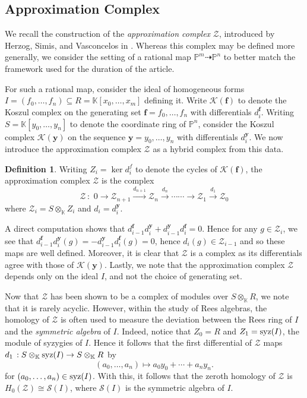 \documentclass[reqno]{amsart}
\numberwithin{equation}{section}
\theoremstyle{definition}
\newtheorem{defn}[thm]{Definition}
\def\Kos{\mathcal{K}}
\def\K{\mathbb{K}}
\def\P{\mathbb{P}}
\def\S{\mathcal{S}}
\def\Z{\mathcal{Z}}
\def\f{\bm{f}}
\def\y{\bm{y}}
\def\syz{\mathop{\rm syz}}
\begin{document}
\subsection{Approximation Complex}

We recall the construction of the \textit{approximation complex} $\Z$, introduced by Herzog, Simis, and Vasconcelos in \cite{HSV82,HSV83}. Whereas this complex may be defined more generally, we consider the setting of a rational map $\P^m\dashrightarrow \P^n$ to better match the framework used for the duration of the article.

For such a rational map, consider the ideal of homogeneous forms $I=(f_0,\ldots,f_n) \subseteq R=\K[x_0,\ldots,x_m]$ defining it. Write $\Kos(\f)$
to denote the Koszul complex on the generating set $\f=f_0,\ldots,f_n$ with differentials $d_i^{\f}$. Writing $S=\K[y_0,\ldots,y_n]$ to denote the coordinate ring of $\P^n$, consider the Koszul complex $\Kos(\y)$ on the sequence $\y= y_0,\ldots,y_n$ with differentials $d_i^{\y}$. We now introduce the approximation complex $\Z$ as a hybrid complex from this data. 


\begin{defn}
Writing $Z_i = \ker d_i^f$ to denote the cycles of $\Kos(\f)$, the approximation complex $\Z$ is the complex 
$$\Z\,:\,\,0 \rightarrow \Z_{n+1}\overset{d_{n+1}}{\longrightarrow}\Z_{n}\overset{d_{n}}{\longrightarrow} \cdots\cdots \longrightarrow\Z_{1}\overset{d_{1}}{\longrightarrow} \Z_0 $$
where $\Z_i = S\otimes_\K Z_i$ and $d_i = d_i^{\y}$.
\end{defn}



A direct computation shows that $d_{i-1}^{\f} d_{i}^{\y}+d_{i-1}^{\y} d_{i}^{\f} =0$. Hence for any $g\in \Z_i$, we see that $d_{i-1}^{\f} d_{i}^{\y} (g) =-d_{i-1}^{\y} d_{i}^{\f}(g) =0$, hence $d_i(g) \in \Z_{i-1}$ and so these maps are well defined. Moreover, it is clear that $\Z$ is a complex as its differentials agree with those of $\Kos(\y)$. Lastly, we note that the approximation complex $\Z$ depends only on the ideal $I$, and not the choice of generating set. 



Now that $\Z$ has been shown to be a complex of modules over $S\otimes_\K R$, we note that it is rarely acyclic. However, within the study of Rees algebras, the homology of $\Z$ is often used to measure the deviation between the Rees ring of $I$ and the \textit{symmetric algebra} of $I$. Indeed, notice that $Z_0=R$ and $Z_1=\syz(I)$, the module of syzygies of $I$. Hence it follows that the first differential of $\Z$ maps $d_1\,:S\otimes_\K\syz(I) \rightarrow S\otimes_\K R$ by
\begin{equation}\label{d_1 syz map}
(a_0,\ldots,a_n)\longmapsto a_0y_0+\cdots+a_ny_n.
\end{equation}
for $(a_0,\ldots,a_n)\in \syz(I)$. With this, it follows that the zeroth homology of $\Z$ is $H_0(\Z) \cong \S(I)$, where $\S(I)$ is the symmetric algebra of $I$.
\end{document}
